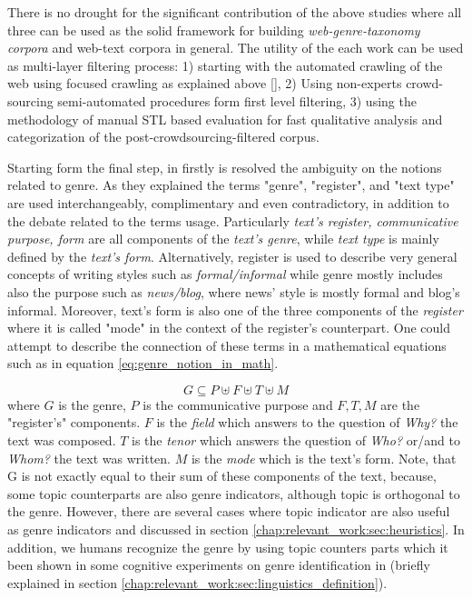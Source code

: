There is no drought for the significant contribution of the above studies where all three can be used as the solid framework for building \textit{web-genre-taxonomy corpora} and web-text corpora in general. The utility of the each work can be used as multi-layer filtering process:  1) starting with the automated crawling of the web using focused crawling as explained above \ref{}, 2) Using non-experts crowd-sourcing semi-automated procedures form first level filtering, 3) using the methodology of manual STL based evaluation for fast qualitative analysis and categorization of the post-crowdsourcing-filtered corpus. 

Starting form the final step, in \parencite{melissourgou2017genre} firstly is resolved the ambiguity on the notions related to genre. As they explained the terms "genre", "register", and "text type" are used interchangeably, complimentary and even contradictory, in addition to the debate related to the terms usage. Particularly \textit{text's register, communicative purpose, form} are all components of the \textit{text's genre}, while \textit{text type} is mainly defined by the \textit{text's form}. Alternatively, register is used to describe very general concepts of writing styles such as \textit{formal/informal} while genre mostly includes also the purpose such as \textit{news/blog}, where news' style is mostly formal and blog's informal. Moreover, text's form is also one of the three components of the \textit{register} where it is called "mode" in the context of the register's counterpart. One could attempt to describe the connection of these terms in a mathematical equations such as in equation \ref{eq:genre_notion_in_math}.  

\begin{equation}\label{eq:genre_notion_in_math}
	G  \subseteq P \uplus F \uplus T \uplus M
\end{equation}
\noindent
where $G$ is the genre, $P$ is the communicative purpose and $F, T, M$ are the "register's" components. $F$ is the \textit{field} which answers to the question of \textit{Why?} the text was composed. $T$ is the \textit{tenor} which answers the question of \textit{Who?} or/and to \textit{Whom?} the text was written. $M$ is the \textit{mode} which is the text's form. Note, that G is not exactly equal to their sum of these components of the text, because, some topic counterparts are also genre indicators, although topic is orthogonal to the genre. However, there are several cases where topic indicator are also useful as genre indicators and discussed in section \ref{chap:relevant_work:sec:heuristics}. In addition, we humans recognize the genre by using topic counters parts which it been shown in some cognitive experiments on genre identification in \parencite{clark2014you, lieungnapar2017genre} (briefly explained in section \ref{chap:relevant_work:sec:linguistics_definition}).

